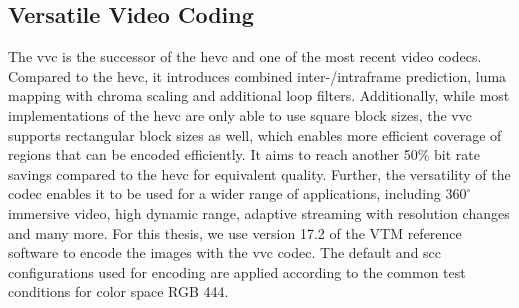 \subsection{Versatile Video Coding}
\label{subsec:vvc}

The \gls{vvc} \cite{vvc_2021} is the successor of the \gls{hevc} and one of the most recent video codecs.
Compared to the \gls{hevc}, it introduces combined inter-/intraframe prediction, luma mapping with chroma scaling and additional loop filters.
Additionally, while most implementations of the \gls{hevc} are only able to use square block sizes, the \gls{vvc} supports rectangular block sizes as well, which enables more efficient coverage of regions that can be encoded efficiently.
It aims to reach another 50\% bit rate savings compared to the \gls{hevc} for equivalent quality.
Further, the versatility of the codec enables it to be used for a wider range of applications, including $360^{\circ}$ immersive video, high dynamic range, adaptive streaming with resolution changes and many more.
For this thesis, we use version 17.2 of the VTM reference software \cite{vvc_software_2022} to encode the images with the \gls{vvc} codec.
The default and \gls{scc} \cite{config_vvc_both_2020} configurations used for encoding are applied according to the common test conditions for color space RGB 444.


